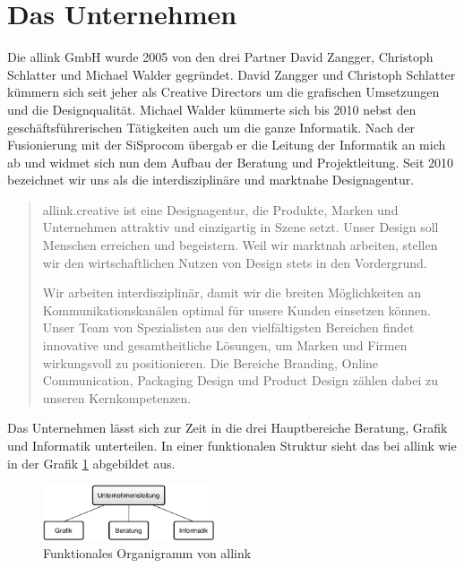 \section{Das Unternehmen}
Die allink GmbH wurde 2005 von den drei Partner David Zangger, Christoph Schlatter
und Michael Walder gegründet. David Zangger und Christoph Schlatter kümmern sich
seit jeher als Creative Directors um die grafischen Umsetzungen und die Designqualität.
Michael Walder kümmerte sich bis 2010 nebst den geschäftsführerischen Tätigkeiten
auch um die ganze Informatik. Nach der Fusionierung mit der SiSprocom übergab
er die Leitung der Informatik an mich ab und widmet sich nun dem Aufbau der
Beratung und Projektleitung. Seit 2010 bezeichnet wir uns als die interdisziplinäre 
und marktnahe Designagentur.

\begin{quote}
allink.creative ist eine Designagentur, die Produkte, Marken und Unternehmen 
attraktiv und einzigartig in Szene setzt. Unser Design soll Menschen erreichen 
und begeistern. Weil wir marktnah arbeiten, stellen wir den wirtschaftlichen 
Nutzen von Design stets in den Vordergrund.

Wir arbeiten interdisziplinär, damit wir die breiten Möglichkeiten an 
Kommunikationskanälen optimal für unsere Kunden einsetzen können. Unser 
Team von Spezialisten aus den vielfältigsten Bereichen findet innovative 
und gesamtheitliche Lösungen, um Marken und Firmen wirkungsvoll zu positionieren. 
Die Bereiche Branding, Online Communication, Packaging Design und Product 
Design zählen dabei zu unseren Kernkompetenzen.
\end{quote}

Das Unternehmen lässt sich zur Zeit in die drei Hauptbereiche Beratung, Grafik
und Informatik unterteilen. In einer funktionalen Struktur sieht das bei allink wie in
der Grafik \ref{pic:funktionales_organigramm} abgebildet aus.

\begin{figure}[htbp]
\begin{center}
\includegraphics[width=0.45\textwidth,angle=0]{./bilder/funktionales_organigramm.pdf}
\caption{Funktionales Organigramm von allink}
\label{pic:funktionales_organigramm}
\end{center}
\end{figure}

